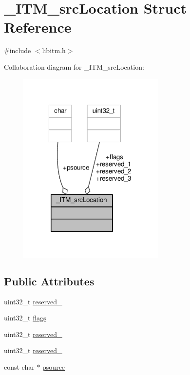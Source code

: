 \hypertarget{struct__ITM__srcLocation}{\section{\-\_\-\-I\-T\-M\-\_\-src\-Location Struct Reference}
\label{struct__ITM__srcLocation}
}


{\ttfamily \#include $<$libitm.\-h$>$}



Collaboration diagram for \-\_\-\-I\-T\-M\-\_\-src\-Location\-:
\nopagebreak
\begin{figure}[H]
\begin{center}
\leavevmode
\includegraphics[width=207pt]{struct__ITM__srcLocation__coll__graph}
\end{center}
\end{figure}
\subsection*{Public Attributes}
\begin{DoxyCompactItemize}
\item 
uint32\-\_\-t \hyperlink{struct__ITM__srcLocation_a184c870ced2e99dff061ac1cc073f5f6}{reserved\-\_}
\item 
uint32\-\_\-t \hyperlink{struct__ITM__srcLocation_abf637c1bb5af730098418fd75fe0f468}{flags}
\item 
uint32\-\_\-t \hyperlink{struct__ITM__srcLocation_acf614ee1ed220ca3afc3571e6beeca5b}{reserved\-\_}
\item 
uint32\-\_\-t \hyperlink{struct__ITM__srcLocation_aeb43959f35bea1370b03ab058f19a18e}{reserved\-\_}
\item 
const char $\ast$ \hyperlink{struct__ITM__srcLocation_a69a483233c726bd374a7ddcc7a9af63b}{psource}
\end{DoxyCompactItemize}


